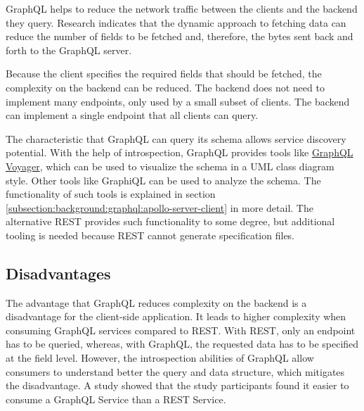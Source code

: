 GraphQL helps to reduce the network traffic between the clients and the backend they query. Research indicates that the dynamic approach to fetching data can reduce the number of fields to be fetched and, therefore, the bytes sent back and forth to the GraphQL server. \cite{inprocessdings:2019:background:graphql:migration-to-graphql}

\bigskip

\noindent Because the client specifies the required fields that should be fetched, the complexity on the backend can be reduced. The backend does not need to implement many endpoints, only used by a small subset of clients. The backend can implement a single endpoint that all clients can query. \cite{book:2018:richardson:background:bff:microservices-patterns}

\bigskip

\noindent The characteristic that GraphQL can query its schema allows service discovery potential. With the help of introspection, GraphQL provides tools like \href{https://ivangoncharov.github.io/graphql-voyager/}{GraphQL Voyager}, which can be used to visualize the schema in a \ac{UML} class diagram style. Other tools like GraphiQL can be used to analyze the schema. The functionality of such tools is explained in section \ref{subsection:background:graphql:apollo-server-client} in more detail. The alternative \ac{REST} provides such functionality to some degree, but additional tooling is needed because \ac{REST} cannot generate specification files.

\subsection{Disadvantages}\label{subsection:background:graphql:graphql-disadvantages}

\noindent The advantage that GraphQL reduces complexity on the backend is a disadvantage for the client-side application. It leads to higher complexity when consuming GraphQL services compared to \ac{REST}. With \ac{REST}, only an endpoint has to be queried, whereas, with GraphQL, the requested data has to be specified at the field level. However, the introspection abilities of GraphQL allow consumers to understand better the query and data structure, which mitigates the disadvantage. A study \cite{inproceedings:2020:brito:background:graphql:rest-vs-graphql} showed that the study participants found it easier to consume a GraphQL Service than a \ac{REST} Service.


